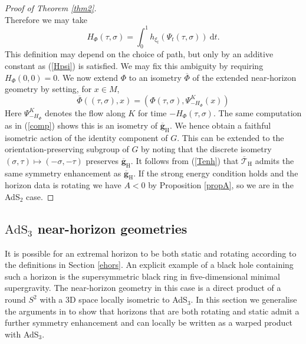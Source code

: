 \documentclass[11pt, reqno]{amsart}
\theoremstyle{plain}
\theoremstyle{definition}
\numberwithin{equation}{section}
\begin{document}
\begin{proof}[Proof of Theorem \ref{thm2}]
\begin{equation*}
\end{equation*}
Therefore we may take
\begin{equation*}
    H_\Phi(\tau,\sigma) = \int_0^1 h_{\xi_t}(\Psi_t(\tau,\sigma))\:\text{d}t.
\end{equation*}
This definition may depend on the choice of path, but only by an additive constant as (\ref{Hpsi}) is satisfied. We may fix this ambiguity by requiring $H_\Phi(0,0) = 0$. We now extend $\Phi$ to an isometry  $\overline{\Phi}$ of the extended near-horizon geometry by setting, for $x \in M$,
\begin{equation*}
    \overline{\Phi}((\tau,\sigma), x) = (\Phi(\tau,\sigma), \Psi^K_{-H_\Phi}(x))
\end{equation*} 
Here $\Psi^K_{-H_\Phi}$ denotes the flow along $K$ for time $-H_\Phi(\tau,\sigma)$. The same computation as in (\ref{comp}) shows this is an isometry of $\overline{\textbf{g}}_{\text{H}}$. We hence obtain a faithful isometric action of the identity component of $G$. This can be extended to the orientation-preserving subgroup of $G$ by noting that the discrete isometry $(\sigma,\tau) \mapsto (-\sigma,-\tau)$ preserves $\overline{\textbf{g}}_{\text{H}}$. It follows from (\ref{Tenh}) that $\overline{\mathcal{T}}_{\text{H}}$ admits the same symmetry enhancement as $\overline{\textbf{g}}_{\text{H}}$. If the strong energy condition holds and the horizon data is rotating we have $A < 0$ by Proposition \ref{propA}, so we are in the AdS$_2$ case.
\end{proof}

\subsection{\texorpdfstring{$\text{AdS}_3$}{AdS3} near-horizon geometries}  \label{ads3} It is possible for an extremal horizon to be both static and rotating according to the definitions in Section \ref{ehors}. An explicit example of a black hole containing such a horizon is the supersymmetric black ring \cite{EEMR04} in five-dimensional minimal supergravity. The near-horizon geometry in this case is a direct product of a round $S^2$ with a 3D space locally isometric to AdS$_3$. In this section we generalise the arguments in \cite{KLR} to show that horizons that are both rotating and static admit a further symmetry enhancement and can locally be written as a warped product with AdS$_3$.
\end{document}
